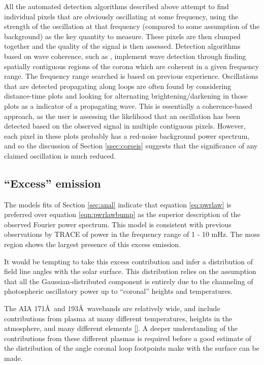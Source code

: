 \documentclass[preprint]{../aastex52/aastex}
\begin{document}
All the automated detection algorithms described above attempt to find
individual pixels that are obviously oscillating at some frequency,
using the strength of the oscillation at that frequency (compared to
some assumption of the background) as the key quantity to measure.
These pixels are then clumped together and the quality of the signal
is then assessed.  Detection algorithms based on wave coherence, such
as \cite{2008SoPh..252..321M}, implement wave detection through
finding spatially contiguous regions of the corona which are coherent
in a given frequency range.  The frequency range searched is based on
previous experience.  Oscillations that are detected propagating along
loops are often found by considering distance-time plots
\cite{demoortel2000, 2003A&A...404L...1K} and looking for alternating
brightening/darkening in those plots as a indicator of a propagating
wave.  This is essentially a coherence-based approach, as the user is
assessing the likelihood that an oscillation has been detected based
on the observed signal in multiple contiguous pixels.  However, each
pixel in these plots probably has a red-noise background power
spectrum, and so the discussion of Section \ref{ssec:corseis} suggests
that the significance of any claimed oscillation is much reduced.


\subsection{``Excess'' emission}\label{ssec:excess}
The models fits of Section \ref{sec:anal} indicate that equation
\ref{eq:pwrlaw} is preferred over equation \ref{eqn:pwrlawbump} as the
superior description of the observed Fourier power spectrum.  This
model is consistent with previous observations by TRACE of power in
the frequency range of 1 - 10 mHz.  The moss region shows the largest
presence of this excess emission.

It would be tempting to take this excess contribution and infer a
distribution of field line angles with the solar surface.  This
distribution relies on the assumption that all the
Gaussian-distributed component is entirely due to the channeling of
photospheric oscillatory power up to ``coronal'' heights and
temperatures.


The AIA 171\AA\ and 193\AA\ wavebands are relatively wide, and include
contributions from plasma at many different temperatures, heights in
the atmosphere, and many different elements \ref{}.  A deeper
understanding of the contributions from these different plasmas is
required before a good estimate of the distribution of the angle
coronal loop footpoints make with the surface can be made.
\end{document}
